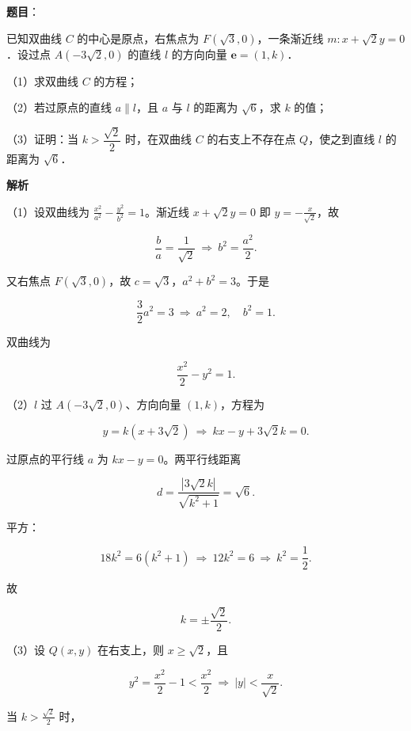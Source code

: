 \begin{answer}

\textbf{题目}：

已知双曲线 $C$ 的中心是原点，右焦点为 $F(\sqrt3,0)$，一条渐近线 $m:x+\sqrt2y=0$．设过点 $A(-3\sqrt2,0)$ 的直线 $l$ 的方向向量 $\boldsymbol e=(1,k)$．

（1）求双曲线 $C$ 的方程；

（2）若过原点的直线 $a\parallel l$，且 $a$ 与 $l$ 的距离为 $\sqrt6$，求 $k$ 的值；

（3）证明：当 $k>\dfrac{\sqrt2}{2}$ 时，在双曲线 $C$ 的右支上不存在点 $Q$，使之到直线 $l$ 的距离为 $\sqrt6$．

\textbf{解析}

（1）设双曲线为 $\frac{x^2}{a^2}-\frac{y^2}{b^2}=1$。渐近线 $x+\sqrt2y=0$ 即 $y=-\frac{x}{\sqrt2}$，故

\nopagebreak[4]
\[\frac ba=\frac1{\sqrt2}\ \Longrightarrow\ b^2=\frac{a^2}{2}.\]

又右焦点 $F(\sqrt3,0)$，故 $c=\sqrt3$，$a^2+b^2=3$。于是

\nopagebreak[4]
\[\frac32a^2=3\ \Longrightarrow\ a^2=2,\quad b^2=1 .\]

双曲线为

\nopagebreak[4]
\[\frac{x^2}{2}-y^2=1 .\]

（2）$l$ 过 $A(-3\sqrt2,0)$、方向向量 $(1,k)$，方程为

\nopagebreak[4]
\[y=k(x+3\sqrt2)\ \Longrightarrow\ kx-y+3\sqrt2k=0 .\]

过原点的平行线 $a$ 为 $kx-y=0$。两平行线距离

\nopagebreak[4]
\[d=\frac{|3\sqrt2k|}{\sqrt{k^2+1}}=\sqrt6 .\]

平方：

\nopagebreak[4]
\[18k^2=6(k^2+1)\ \Longrightarrow\ 12k^2=6\ \Longrightarrow\ k^2=\frac12 .\]

故

\nopagebreak[4]
\[k=\pm\frac{\sqrt2}{2} .\]

（3）设 $Q(x,y)$ 在右支上，则 $x\geqslant\sqrt2$，且

\nopagebreak[4]
\[y^2=\frac{x^2}{2}-1<\frac{x^2}{2}\ \Longrightarrow\ |y|<\frac{x}{\sqrt2}.\]

当 $k>\frac{\sqrt2}{2}$ 时，


\end{answer}
